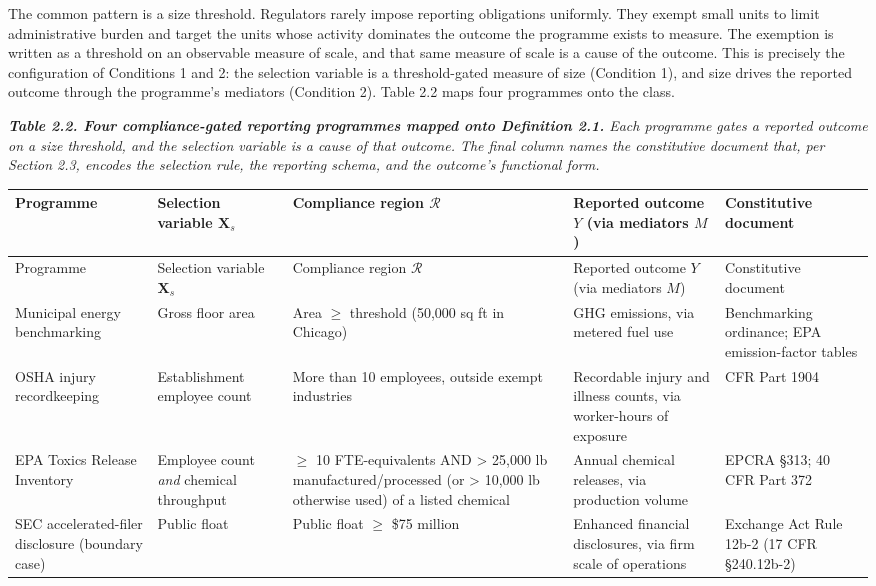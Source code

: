 The common pattern is a size threshold. Regulators rarely impose reporting obligations uniformly. They exempt small units to limit administrative burden and target the units whose activity dominates the outcome the programme exists to measure. The exemption is written as a threshold on an observable measure of scale, and that same measure of scale is a cause of the outcome. This is precisely the configuration of Conditions 1 and 2: the selection variable is a threshold-gated measure of size (Condition 1), and size drives the reported outcome through the programme's mediators (Condition 2). Table 2.2 maps four programmes onto the class.

\par\medskip\noindent
{\small\itshape \textbf{Table 2.2. Four compliance-gated reporting programmes mapped onto Definition 2.1.} Each programme gates a reported outcome on a size threshold, and the selection variable is a cause of that outcome. The final column names the constitutive document that, per Section 2.3, encodes the selection rule, the reporting schema, and the outcome's functional form.\par}
\nopagebreak\medskip\nopagebreak
{
\footnotesize
\setlength{\tabcolsep}{5pt}
\renewcommand{\arraystretch}{1.15}
\begin{longtable}{>{\raggedright\arraybackslash}p{}>{\raggedright\arraybackslash}p{}>{\raggedright\arraybackslash}p{}>{\raggedright\arraybackslash}p{}>{\raggedright\arraybackslash}p{}}
\toprule
Programme & Selection variable $\mathbf{X}_s$ & Compliance region $\mathcal{R}$ & Reported outcome $Y$ (via mediators $M$) & Constitutive document \\
\midrule
\endfirsthead
\toprule
Programme & Selection variable $\mathbf{X}_s$ & Compliance region $\mathcal{R}$ & Reported outcome $Y$ (via mediators $M$) & Constitutive document \\
\midrule
\endhead
\bottomrule
\endlastfoot
Municipal energy benchmarking & Gross floor area & Area $\geq$ threshold (50,000 sq ft in Chicago) & GHG emissions, via metered fuel use & Benchmarking ordinance; EPA emission-factor tables \\
OSHA injury recordkeeping & Establishment employee count & More than 10 employees, outside exempt industries & Recordable injury and illness counts, via worker-hours of exposure & 29 CFR Part 1904 \\
EPA Toxics Release Inventory & Employee count \textit{and} chemical throughput & $\geq$ 10 FTE-equivalents AND > 25,000 lb manufactured/processed (or > 10,000 lb otherwise used) of a listed chemical & Annual chemical releases, via production volume & EPCRA §313; 40 CFR Part 372 \\
SEC accelerated-filer disclosure (boundary case) & Public float & Public float $\geq$ \$75 million & Enhanced financial disclosures, via firm scale of operations & Exchange Act Rule 12b-2 (17 CFR §240.12b-2) \\
\end{longtable}
}
\par\medskip


